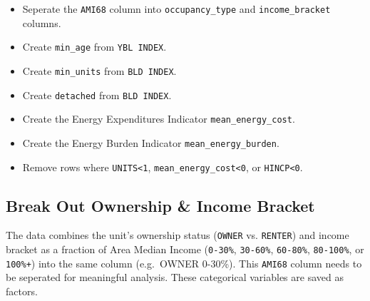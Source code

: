 \documentclass[]{article}
\newenvironment{Shaded}{\begin{snugshade}}{\end{snugshade}}
\newcommand{\CommentTok}[1]{\textcolor[rgb]{0.56,0.35,0.01}{\textit{#1}}}
\newcommand{\DataTypeTok}[1]{\textcolor[rgb]{0.13,0.29,0.53}{#1}}
\newcommand{\KeywordTok}[1]{\textcolor[rgb]{0.13,0.29,0.53}{\textbf{#1}}}
\newcommand{\NormalTok}[1]{#1}
\newcommand{\OperatorTok}[1]{\textcolor[rgb]{0.81,0.36,0.00}{\textbf{#1}}}
\newcommand{\OtherTok}[1]{\textcolor[rgb]{0.56,0.35,0.01}{#1}}
\newcommand{\StringTok}[1]{\textcolor[rgb]{0.31,0.60,0.02}{#1}}
\providecommand{\tightlist}{%
  \setlength{\itemsep}{0pt}\setlength{\parskip}{0pt}}
\begin{document}
\begin{itemize}
\tightlist
\item
  Seperate the \texttt{AMI68} column into \texttt{occupancy\_type} and
  \texttt{income\_bracket} columns.
\item
  Create \texttt{min\_age} from \texttt{YBL\ INDEX}.
\item
  Create \texttt{min\_units} from \texttt{BLD\ INDEX}.
\item
  Create \texttt{detached} from \texttt{BLD\ INDEX}.
\item
  Create the Energy Expenditures Indicator \texttt{mean\_energy\_cost}.
\item
  Create the Energy Burden Indicator \texttt{mean\_energy\_burden}.
\item
  Remove rows where \texttt{UNITS\textless{}1},
  \texttt{mean\_energy\_cost\textless{}0}, or
  \texttt{HINCP\textless{}0}.
\end{itemize}

\hypertarget{break-out-ownership-income-bracket}{%
\subsection{Break Out Ownership \& Income
Bracket}\label{break-out-ownership-income-bracket}}

The data combines the unit's ownership status (\texttt{OWNER} vs.
\texttt{RENTER}) and income bracket as a fraction of Area Median Income
(\texttt{0-30\%}, \texttt{30-60\%}, \texttt{60-80\%}, \texttt{80-100\%},
or \texttt{100\%+}) into the same column (e.g.~OWNER 0-30\%). This
\texttt{AMI68} column needs to be seperated for meaningful analysis.
These categorical variables are saved as factors.

\begin{Shaded}
\end{Shaded}
\end{document}
